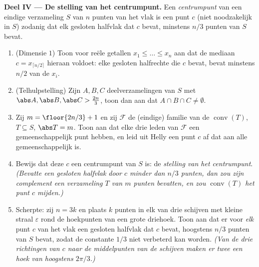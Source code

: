 \begin{problem}
\medskip
\noindent\textbf{Deel IV --- De stelling van het centrumpunt.} Een
\emph{centrumpunt} van een eindige verzameling $S$ van $n$ punten
van het vlak is een punt $c$ (niet noodzakelijk in $S$) zodanig dat
elk gesloten halfvlak dat $c$ bevat, minstens $n/3$ punten van $S$
bevat.
\begin{enumerate}[resume]
  \item (Dimensie $1$) Toon voor reële getallen $x_1 \leq \dots
        \leq x_n$ aan dat de mediaan $c = x_{\lceil n/2 \rceil}$
        hieraan voldoet: elke gesloten halfrechte die $c$ bevat,
        bevat minstens $n/2$ van de $x_i$.
  \item (Telhulpstelling) Zijn $A, B, C$ deelverzamelingen van $S$
        met $\abs A, \abs B, \abs C > \tfrac{2n}3$, toon dan aan
        dat $A \cap B \cap C \neq \emptyset$.
  \item Zij $m = \floor{2n/3} + 1$ en zij $\mathcal F$ de
        (eindige) familie van de 
        $\operatorname{conv}(T)$, $T \subseteq S$, $\abs T = m$.
        Toon aan dat elke drie leden van $\mathcal F$ een
        gemeenschappelijk punt hebben, en leid uit Helly een punt
        $c$ af dat aan alle gemeenschappelijk is.
  \item Bewijs dat deze $c$ een centrumpunt van $S$ is: de
        \emph{stelling van het centrumpunt}. \emph{(Bevatte een
        gesloten halfvlak door $c$ minder dan $n/3$ punten, dan zou
        zijn  complement een verzameling $T$ van $m$ punten
        bevatten, en zou $\operatorname{conv}(T)$ het punt $c$
        mijden.)}
  \item Scherpte: zij $n = 3k$ en plaats $k$ punten in elk van
        drie schijven met kleine straal $\varepsilon$ rond de
        hoekpunten van een grote driehoek. Toon aan dat er voor
        \emph{elk} punt $c$ van het vlak een gesloten halfvlak dat
        $c$ bevat, hoogstens $n/3$ punten van $S$ bevat, zodat de
        constante $1/3$ niet verbeterd kan worden. \emph{(Van de
        drie richtingen van $c$ naar de middelpunten van de
        schijven maken er twee een hoek van hoogstens
        $2\pi/3$.)}
\end{enumerate}


\end{problem}
